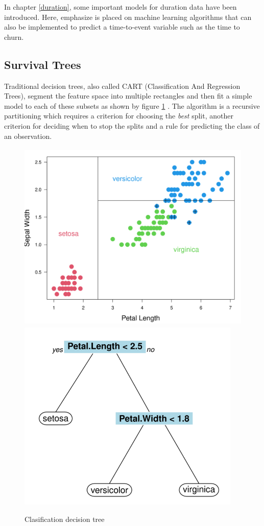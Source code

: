 \documentclass[
]{book}
\begin{document}
In chapter \ref{duration}, some important models for duration data have been introduced. Here, emphasize is placed on machine learning algorithms that can also be implemented to predict a time-to-event variable such as the time to churn.

\hypertarget{survival-trees}{%
\subsection{Survival Trees}\label{survival-trees}}

Traditional decision trees, also called CART (Classification And Regression Trees), segment the feature space into multiple rectangles and then fit a simple model to each of these subsets as shown by figure \ref{fig:tree} \citep{ML_TREE}. The algorithm is a recursive partitioning which requires a criterion for choosing the \emph{best} split, another criterion for deciding when to stop the splits and a rule for predicting the class of an observation.

\begin{figure}

{\centering \includegraphics[width=0.45\linewidth,height=260pt]{./imgs/tree1} \includegraphics[width=0.45\linewidth,height=260pt]{./imgs/tree2} 

}

\caption{Clasification decision tree}\label{fig:tree}
\end{figure}
\end{document}
